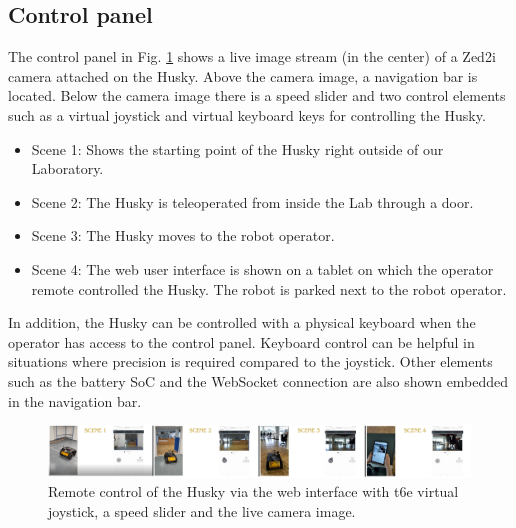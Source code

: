 \documentclass[letterpaper, 10 pt, conference]{ieeeconf}  %
\begin{document}
\subsection{Control panel}
The control panel in Fig. \ref{fig:clip} shows a live image stream (in the center) of a Zed2i camera attached on the Husky. Above the camera image, a navigation bar is located. 
Below the camera image there is a speed slider and two control elements such as a virtual joystick and virtual keyboard keys for controlling the Husky.
\begin{itemize}
    \item Scene 1: Shows the starting point of the Husky right outside of our Laboratory. 
    \item Scene 2: The Husky is teleoperated from inside the Lab through a door.
    \item Scene 3: The Husky moves to the robot operator.
    \item Scene 4: The web user interface is shown on a tablet on which the operator remote controlled the Husky. The robot is parked next to the robot operator.
\end{itemize} 
In addition, the Husky can be controlled with a physical keyboard when the operator has access to the control panel. Keyboard control can be helpful in situations where precision is required compared to the joystick.
Other elements such as the battery SoC and the WebSocket connection are also shown embedded in the navigation bar.

\begin{figure}[t]
    \centerline{\includegraphics[width=17.35cm]{images/clipbig.png}}
    \caption{Remote control of the Husky via the web interface with t6e virtual joystick, a speed slider and the live camera image.}
    \label{fig:clip}
\end{figure}


\end{document}
